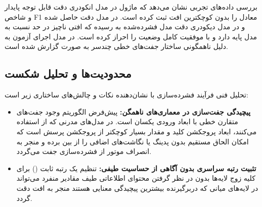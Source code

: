 بررسی داده‌های تجربی نشان می‌دهد که ماژول  در مدل انکودری  دقت قابل توجه پایدار  و شاخص F1 معادل  را بدون کوچکترین افت ثبت کرده است. در مدل  دقت  حاصل شده و در مدل دیکودری  دقت مدل فشرده‌شده به  رسیده که افتی ناچیز در حد  نسبت به مدل پایه دارد و با موفقیت کامل وضعیت  را احراز کرده است. در مدل  اجرای آزمون به دلیل ناهمگونی ساختار جفت‌های خطی چندسر به صورت  گزارش شده است.

\subsection{محدودیت‌ها و تحلیل شکست}
تحلیل فنی فرآیند فشرده‌سازی با  نشان‌دهنده نکات و چالش‌های ساختاری زیر است:
\begin{itemize}
    \item \textbf{پیچیدگی جفت‌سازی در معماری‌های ناهمگن:} پیش‌فرض الگوریتم  وجود جفت‌های متقارن خطی با ابعاد ورودی یکسان است. در مدل‌های مدرنی که از  استفاده می‌کنند، ابعاد پروجکشن کلید و مقدار بسیار کوچکتر از پروجکشن پرسش است که امکان الحاق مستقیم بدون پدینگ یا نگاشت‌های اضافی را از بین برده و منجر به انصراف موتور از فشرده‌سازی جفت می‌گردد.
    \item \textbf{تثبیت رتبه سراسری بدون آگاهی از حساسیت طیفی:} تنظیم یک رتبه ثابت () برای کلیه زوج لایه‌ها بدون در نظر گرفتن محتوای اطلاعاتی طیف مقادیر منفرد می‌تواند در لایه‌های میانی که دربرگیرنده بیشترین پیچیدگی معنایی هستند منجر به افت دقت گردد.
\end{itemize}
